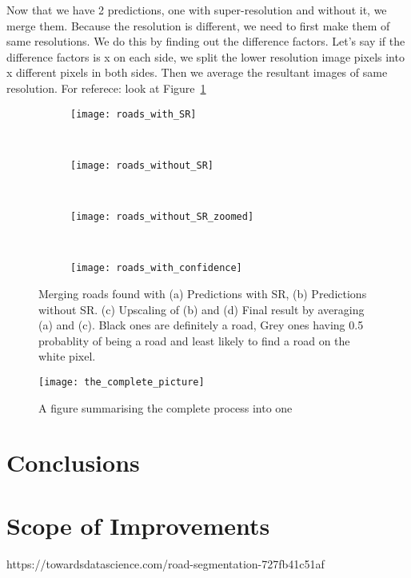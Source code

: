 

Now that we have 2 predictions, one with super-resolution and without it, we merge them. Because the resolution is different, we need to first make them of same resolutions. We do this by finding out the difference factors. Let's say if the difference factors is x on each side, we split the lower resolution image pixels into x different pixels in both sides. Then we average the resultant images of same resolution. For referece: look at Figure~\ref{fig:roads_in_confidence}

\begin{figure}[h!]
  \centering
  \begin{subfigure}{0.25\textwidth}
    \texttt{[image: roads\_with\_SR]}
    \caption{}
  \end{subfigure}~
  \begin{subfigure}{0.15\textwidth}
    \texttt{[image: roads\_without\_SR]}
    \caption{}
  \end{subfigure}~
  \begin{subfigure}{0.25\textwidth}
    \texttt{[image: roads\_without\_SR\_zoomed]}
    \caption{}
  \end{subfigure}~
  \begin{subfigure}{0.25\textwidth}
    \texttt{[image: roads\_with\_confidence]}
    \caption{}
  \end{subfigure}
  \caption[Finding likelihood of roads in predictions.]{Merging roads found with (a) Predictions with SR, (b) Predictions without SR. (c) Upscaling of (b) and (d) Final result by averaging (a) and (c). Black ones are definitely a road, Grey ones having 0.5 probablity of being a road and  least likely to find a road on the white pixel.}
  \label{fig:roads_in_confidence}
\end{figure}




\begin{sidewaysfigure}
  \centering
  \texttt{[image: the\_complete\_picture]}
  \caption{A figure summarising the complete process into one}
  \label{fig:the_complete_picture}
\end{sidewaysfigure}


\chapter{Conclusions}
\chapter{Scope of Improvements}
https://towardsdatascience.com/road-segmentation-727fb41c51af
\pagebreak
